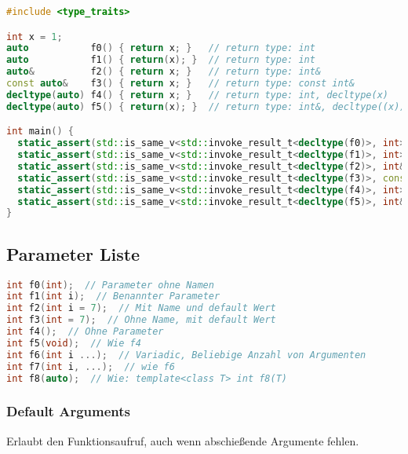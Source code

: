 \begin{lstlisting}[basicstyle=\ttfamily\footnotesize,language=C++]
#include <type_traits>

int x = 1;
auto           f0() { return x; }   // return type: int
auto           f1() { return(x); }  // return type: int
auto&          f2() { return x; }   // return type: int&
const auto&    f3() { return x; }   // return type: const int&
decltype(auto) f4() { return x; }   // return type: int, decltype(x)
decltype(auto) f5() { return(x); }  // return type: int&, decltype((x))

int main() {
  static_assert(std::is_same_v<std::invoke_result_t<decltype(f0)>, int>);
  static_assert(std::is_same_v<std::invoke_result_t<decltype(f1)>, int>);
  static_assert(std::is_same_v<std::invoke_result_t<decltype(f2)>, int&>);
  static_assert(std::is_same_v<std::invoke_result_t<decltype(f3)>, const int&>);
  static_assert(std::is_same_v<std::invoke_result_t<decltype(f4)>, int>);
  static_assert(std::is_same_v<std::invoke_result_t<decltype(f5)>, int&>);
}
\end{lstlisting}

\subsection{Parameter Liste}

\begin{lstlisting}[language=C++]
int f0(int);  // Parameter ohne Namen
int f1(int i);  // Benannter Parameter
int f2(int i = 7);  // Mit Name und default Wert
int f3(int = 7);  // Ohne Name, mit default Wert
int f4();  // Ohne Parameter
int f5(void);  // Wie f4
int f6(int i ...);  // Variadic, Beliebige Anzahl von Argumenten
int f7(int i, ...);  // wie f6
int f8(auto);  // Wie: template<class T> int f8(T)
\end{lstlisting}

\subsubsection{Default Arguments}

Erlaubt den Funktionsaufruf, auch wenn abschießende Argumente fehlen.

